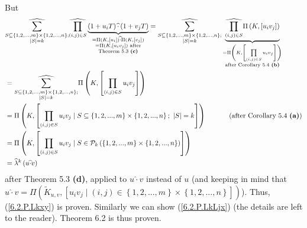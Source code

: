\documentclass[12pt,final,notitlepage,onecolumn,german]{article}%
\begin{document}
But%
\begin{align*}
&  \widehat{\sum_{\substack{S\subseteq\left\{  1,2,...,m\right\}
\times\left\{  1,2,...,n\right\}  ;\\\left\vert S\right\vert =k}}}%
\widehat{\prod_{\left(  i,j\right)  \in S}}\underbrace{\left(  1+u_{i}%
T\right)  \widehat{\cdot}\left(  1+v_{j}T\right)  }_{\substack{=\Pi\left(
K,\left[  u_{i}\right]  \right)  \widehat{\cdot}\Pi\left(  K,\left[
v_{j}\right]  \right)  \\=\Pi\left(  K,\left[  u_{i}v_{j}\right]  \right)
\text{ after}\\\text{Theorem 5.3 \textbf{(c)}}}}=\widehat{\sum
_{\substack{S\subseteq\left\{  1,2,...,m\right\}  \times\left\{
1,2,...,n\right\}  ;\\\left\vert S\right\vert =k}}}\underbrace{\widehat
{\prod_{\left(  i,j\right)  \in S}}\Pi\left(  K,\left[  u_{i}v_{j}\right]
\right)  }_{\substack{=\Pi\left(  K,\left[  \prod\limits_{\left(  i,j\right)
\in S}u_{i}v_{j}\right]  \right)  \\\text{after Corollary 5.4 \textbf{(b)}}%
}}\\
&  =\widehat{\sum_{\substack{S\subseteq\left\{  1,2,...,m\right\}
\times\left\{  1,2,...,n\right\}  ;\\\left\vert S\right\vert =k}}}\Pi\left(
K,\left[  \prod\limits_{\left(  i,j\right)  \in S}u_{i}v_{j}\right]  \right)
\\
&  =\Pi\left(  K,\left[  \prod_{\left(  i,j\right)  \in S}u_{i}v_{j}\mid
S\subseteq\left\{  1,2,...,m\right\}  \times\left\{  1,2,...,n\right\}
;\ \left\vert S\right\vert =k\right]  \right)  \ \ \ \ \ \ \ \ \ \ \left(
\text{after Corollary 5.4 \textbf{(a)}}\right) \\
&  =\Pi\left(  K,\left[  \prod_{\left(  i,j\right)  \in S}u_{i}v_{j}\mid
S\in\mathcal{P}_{k}\left(  \left\{  1,2,...,m\right\}  \times\left\{
1,2,...,n\right\}  \right)  \right]  \right) \\
&  =\widehat{\lambda}^{k}\left(  u\widehat{\cdot}v\right)
\end{align*}
after Theorem 5.3 \textbf{(d)}, applied to $u\widehat{\cdot}v$ instead of $u$
(and keeping in mind that $u\widehat{\cdot}v=\Pi\left(  \widetilde{K}%
_{u,v},\left[  u_{i}v_{j}\mid\left(  i,j\right)  \in\left\{
1,2,...,m\right\}  \times\left\{  1,2,...,n\right\}  \right]  \right)  $).
Thus, (\ref{6.2.P.Lkxy}) is proven. Similarly we can show (\ref{6.2.P.LkLjx})
(the details are left to the reader). Theorem 6.2 is thus proven.
\end{document}
